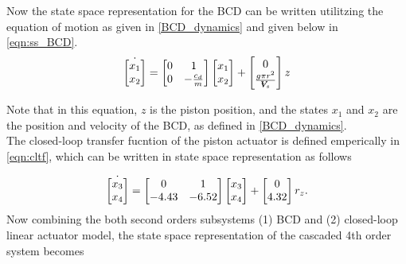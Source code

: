 \documentclass[conference, letterpaper]{IEEEtran}
\DeclareRobustCommand{\volume}{\text{\volumedash}V}
\newcommand{\volumedash}{%
  \makebox[0pt][l]{%
    \ooalign{$V$\cr\raisebox{0.15em}{\kern0.04em--}\cr}%
  }%
}
\begin{document}
Now the state space representation for the BCD can be written utilitzing the equation of motion as given in \eqref{BCD_dynamics}  and given below in \eqref{eqn:ss_BCD}.
\begin{equation}
    \Dot{
        \begin{bmatrix}
            x_1 \\
            x_2
        \end{bmatrix}
    } =
    \begin{bmatrix}
        0 & 1              \\
        0 & -\frac{c_d}{m}
    \end{bmatrix}
    \begin{bmatrix}
        x_1 \\
        x_2
    \end{bmatrix}
    +
    \begin{bmatrix}
        0 \\
        \frac{g\pi r^2}{\volume_s}
    \end{bmatrix} z
    \\
    \label{eqn:ss_BCD}
\end{equation}

Note that in this equation,  $z$ is the piston position, and the states $x_1$ and $x_2$ are the position and velocity of the BCD, as defined in \eqref{BCD_dynamics}.
\\

The closed-loop transfer fucntion of the piston actuator is defined emperically in \eqref{eqn:cltf}, which can be written in state space representation as follows


\begin{equation}
    \Dot{
        \begin{bmatrix}
            x_3 \\
            x_4
        \end{bmatrix}
    } =
    \begin{bmatrix}
        0     & 1     \\
        -4.43 & -6.52
    \end{bmatrix}
    \begin{bmatrix}

        x_3 \\
        x_4
    \end{bmatrix}
    +
    \begin{bmatrix}

        0 \\
        4.32
    \end{bmatrix} r_z.
    \\
    \label{eqn:ss_cl_act}
\end{equation}
Now combining the both second orders subsystems (1) BCD and (2) closed-loop linear actuator model, the state space representation of the cascaded 4th order system becomes
\end{document}
